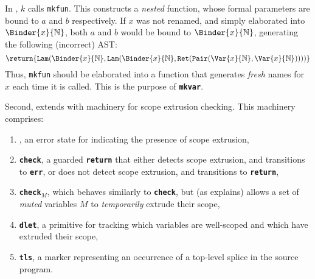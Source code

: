 \begin{enumerate}
In , $k$ calls \texttt{mkfun}. This constructs a \textit{nested} function, whose formal parameters are bound to $a$ and $b$ respectively. If $x$ was not renamed, and simply elaborated into $\Binder{x}{\mathbb{N}}$, both $a$ and $b$ would be bound to $\Binder{x}{\mathbb{N}}$, generating the following (incorrect) AST: 
 \[\return{\texttt{Lam}(\Binder{x}{\mathbb{N}}, \texttt{Lam}(\Binder{x}{\mathbb{N}}, \texttt{Ret}(\texttt{Pair}(\Var{x}{\mathbb{N}}, \Var{x}{\mathbb{N}}))))}\]
 Thus, \texttt{mkfun} should be elaborated into a function that generates \textit{fresh} names for $x$ each time it is called. This is the purpose of \textbf{\texttt{mkvar}}. 
\end{enumerate}

Second, \coreLang{} extends \efflang{} with machinery for scope extrusion checking. This machinery comprises:
\begin{enumerate}
\item \err{}, an error state for indicating the presence of scope extrusion,
\item \textbf{\texttt{check}}, a guarded \textbf{\texttt{return}} that either detects scope extrusion, and transitions to \textbf{\texttt{err}}, or does not detect scope extrusion, and transitions to \textbf{\texttt{return}},
\item \textbf{\texttt{check$_M$}}, which behaves similarly to \textbf{\texttt{check}}, but (as  explains) allows a set of \textit{muted} variables $M$ to \textit{temporarily} extrude their scope,
\item \textbf{\texttt{dlet}}, a primitive for tracking which variables are well-scoped and which have extruded their scope,
\item \textbf{\texttt{tls}}, a marker representing an occurrence of a top-level splice in the source program. 
\end{enumerate}


